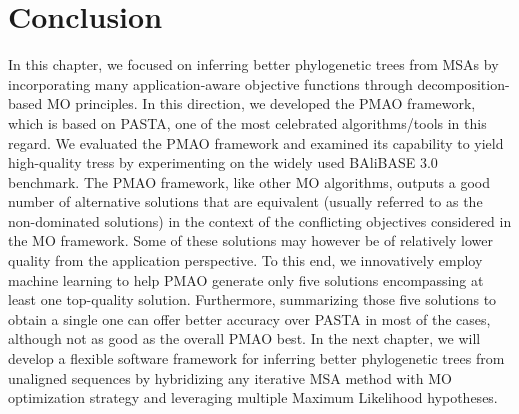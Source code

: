 \section{Conclusion}
In this chapter, we focused on inferring better phylogenetic trees from MSAs by incorporating many application-aware objective functions through decomposition-based MO principles. In this direction, we developed the PMAO framework, which is based on PASTA, one of the most celebrated algorithms/tools in this regard. We evaluated the PMAO framework and examined its capability to yield high-quality tress by experimenting on the widely used BAliBASE 3.0 benchmark. The PMAO framework, like other MO algorithms, outputs a good number of alternative solutions that are equivalent (usually referred to as the non-dominated solutions) in the context of the conflicting objectives considered in the MO framework. Some of these solutions may however be of relatively lower quality from the application perspective. To this end, we innovatively employ machine learning to help PMAO generate only five solutions encompassing at least one top-quality solution. Furthermore, summarizing those five solutions to obtain a single one can offer better accuracy over PASTA in most of the cases, although not as good as the overall PMAO best. In the next chapter, we will develop a flexible software framework for inferring better phylogenetic trees from unaligned sequences by hybridizing any iterative MSA method with MO optimization strategy and leveraging multiple Maximum Likelihood hypotheses.

 

%
%



